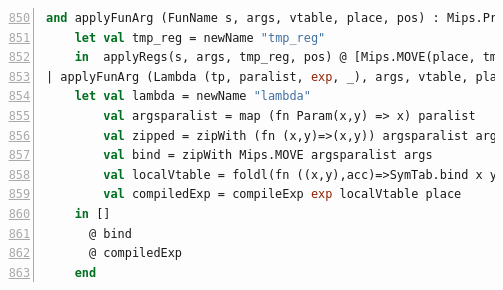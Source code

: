 \documentclass[11pt]{article}
\begin{document}
 \begin{lstlisting}[language=ML,basicstyle=\footnotesize,caption={Lambda in CodeGen.sml },firstnumber=850,breaklines=false,numbers=left]
and applyFunArg (FunName s, args, vtable, place, pos) : Mips.Prog =
    let val tmp_reg = newName "tmp_reg"
    in  applyRegs(s, args, tmp_reg, pos) @ [Mips.MOVE(place, tmp_reg)] end
| applyFunArg (Lambda (tp, paralist, exp, _), args, vtable, place, pos) =
    let val lambda = newName "lambda"
        val argsparalist = map (fn Param(x,y) => x) paralist
        val zipped = zipWith (fn (x,y)=>(x,y)) argsparalist args
        val bind = zipWith Mips.MOVE argsparalist args
        val localVtable = foldl(fn ((x,y),acc)=>SymTab.bind x y acc) (SymTab.empty()) zipped
        val compiledExp = compileExp exp localVtable place
    in []
      @ bind
      @ compiledExp
    end
\end{lstlisting}
\end{document}

